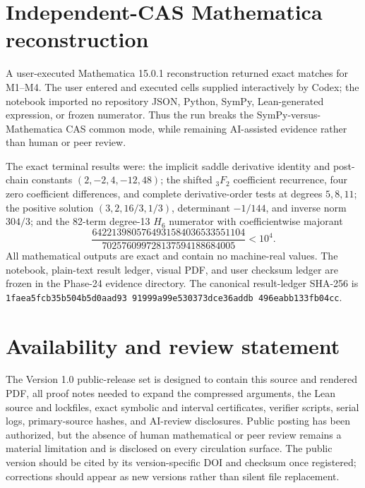 \documentclass[11pt]{article}
\theoremstyle{definition}
\theoremstyle{remark}
\begin{document}
\section{Independent-CAS Mathematica reconstruction}\label{sec:mathematica}

A user-executed Mathematica 15.0.1 reconstruction returned exact matches for
M1--M4.  The user entered and executed cells supplied interactively by Codex;
the notebook imported no repository JSON, Python, SymPy, Lean-generated
expression, or frozen numerator.  Thus the run breaks the
SymPy-versus-Mathematica CAS common mode, while remaining AI-assisted evidence
rather than human or peer review.

The exact terminal results were: the implicit saddle derivative identity and
post-chain constants $(2,-2,4,-12,48)$; the shifted ${}_3F_2$ coefficient
recurrence, four zero coefficient differences, and complete derivative-order
tests at degrees $5,8,11$; the positive solution
$(3,2,16/3,1/3)$, determinant $-1/144$, and inverse norm $304/3$; and the
82-term degree-13 $H_6$ numerator with coefficientwise majorant
\[
 \frac{6422139805764931584036533551104}
 {702576099728137594188684005}<10^4.
\]
All mathematical outputs are exact and contain no machine-real values.  The
notebook, plain-text result ledger, visual PDF, and user checksum ledger are
frozen in the Phase-24 evidence directory.  The canonical result-ledger
SHA-256 is
\texttt{1faea5fc\allowbreak b35b504b\allowbreak 5d0aad93\allowbreak
91999a99\allowbreak e530373d\allowbreak ce36addb\allowbreak
496eabb1\allowbreak 33fb04cc}.

\section{Availability and review statement}

The Version 1.0 public-release set is designed to contain this source and rendered PDF,
all proof notes needed to expand the compressed arguments, the Lean source
and lockfiles, exact symbolic and interval certificates, verifier scripts,
serial logs, primary-source hashes, and AI-review disclosures.  Public
posting has been authorized, but the absence of human mathematical or peer
review remains a material limitation and is disclosed on every circulation
surface.  The public version should be cited by its version-specific DOI and
checksum once registered; corrections should appear as new versions rather
than silent file replacement.
\end{document}
